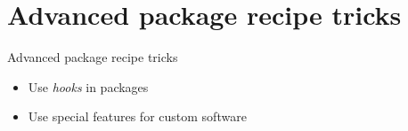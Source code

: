 \section{Advanced package recipe tricks}

\setuplabframe
{Advanced package recipe tricks}
{
  \begin{itemize}
  \item Use {\em hooks} in packages
  \item Use special features for custom software
  \end{itemize}
}
